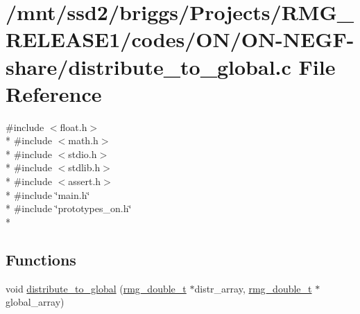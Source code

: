 \hypertarget{_o_n_2_o_n-_n_e_g_f-share_2distribute__to__global_8c}{\section{/mnt/ssd2/briggs/\-Projects/\-R\-M\-G\-\_\-\-R\-E\-L\-E\-A\-S\-E1/codes/\-O\-N/\-O\-N-\/\-N\-E\-G\-F-\/share/distribute\-\_\-to\-\_\-global.c File Reference}
\label{_o_n_2_o_n-_n_e_g_f-share_2distribute__to__global_8c}
}
{\ttfamily \#include $<$float.\-h$>$}\\*
{\ttfamily \#include $<$math.\-h$>$}\\*
{\ttfamily \#include $<$stdio.\-h$>$}\\*
{\ttfamily \#include $<$stdlib.\-h$>$}\\*
{\ttfamily \#include $<$assert.\-h$>$}\\*
{\ttfamily \#include \char`\"{}main.\-h\char`\"{}}\\*
{\ttfamily \#include \char`\"{}prototypes\-\_\-on.\-h\char`\"{}}\\*
\subsection*{Functions}
\begin{DoxyCompactItemize}
\item 
void \hyperlink{_o_n_2_o_n-_n_e_g_f-share_2distribute__to__global_8c_aad6f5a51cb267efdf2d148d2d397479c}{distribute\-\_\-to\-\_\-global} (\hyperlink{rmgtypes_8h_aaa16921c14f121c56eaa42390a340db8}{rmg\-\_\-double\-\_\-t} $\ast$distr\-\_\-array, \hyperlink{rmgtypes_8h_aaa16921c14f121c56eaa42390a340db8}{rmg\-\_\-double\-\_\-t} $\ast$global\-\_\-array)
\end{DoxyCompactItemize}


